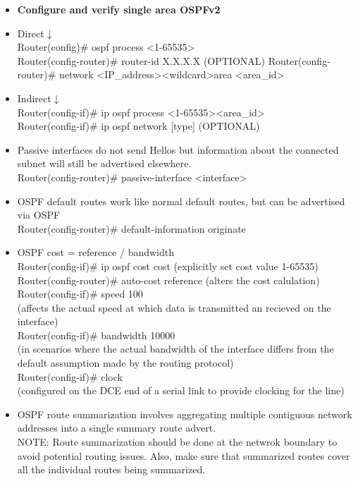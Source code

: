 \documentclass{article}
\begin{document}
\begin{itemize}
  \item \textbf{Configure and verify single area OSPFv2}
  	\item[] Direct$\downarrow$\\
  		Router(config)\# ospf process \textless 1-65535\textgreater\\
  		Router(config-router)\# router-id X.X.X.X (OPTIONAL)
  		Router(config-router)\# network \textless IP\_address\textgreater \textless wildcard\textgreater area \textless area\_id\textgreater
  	\item[] Indirect$\downarrow$\\
  		Router(config-if)\# ip ospf process \textless 1-65535\textgreater \textless area\_id\textgreater\\
  		Router(config-if)\# ip ospf network [type] (OPTIONAL)
  	\item[] Passive interfaces do not send Hellos but information about the connected subnet will still be advertised elsewhere.\\
  		Router(config-router)\# passive-interface \textless interface\textgreater
  	\item[] OSPF default routes work like normal default routes, but can be advertised via OSPF\\
  		Router(config-router)\# default-information originate
  	\item[] OSPF cost = reference / bandwidth\\
  		Router(config-if)\# ip ospf cost cost (explicitly set cost value 1-65535)\\
  		Router(config-router)\# auto-cost reference (alters the cost calulation)\\
  		Router(config-if)\# speed 100\\
  		(affects the actual speed at which data is transmitted an recieved on the interface)\\
  		Router(config-if)\# bandwidth 10000\\
  		(in scenarios where the actual bandwidth of the interface differs from the default assumption made by the routing protocol)\\
  		Router(config-if)\# clock\\
  		(configured on the DCE end of a serial link to provide clocking for the line)
  	\item[] OSPF route summarization involves aggregating multiple contiguous network addresses into a single summary route advert.\\
  		NOTE: Route summarization should be done at the netwrok boundary to avoid potential routing issues. Also, make sure that summarized routes cover all the individual routes being summarized.\\

\end{itemize}
\end{document}
